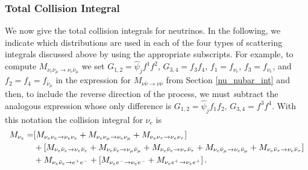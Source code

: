 \subsubsection{Total Collision Integral}
We now give the total collision integrals for neutrinos.    In the following, we indicate which distributions are used in each of the four types of scattering integrals discussed above by using the appropriate subscripts. For example, to compute $M_{\nu_e\bar\nu_\mu\rightarrow\nu_e\bar\nu_\mu}$  we set $G_{1,2}=\hat\psi_jf^1f^2$, $G_{3,4}=f_3f_4$, $f_1= f_{\nu_e}$, $f_3=f_{\nu_e}$, and $f_2=f_4=f_{\bar\nu_\mu}$ in the expression for $M_{\nu\bar\nu\rightarrow\nu\bar\nu}$ from Section \ref{nu_nubar_int} and then, to include the reverse direction of the process, we must {\emph subtract}  the analogous expression whose only difference is $G_{1,2}=\hat\psi_jf_1f_2$, $G_{3,4}=f^3f^4$.
With this notation the collision integral for $\nu_e$ is
\begin{align}\label{M_tot}
M_{\nu_e}=&[M_{\nu_e\nu_e\rightarrow\nu_e\nu_e}+M_{\nu_e\nu_\mu\rightarrow\nu_e\nu_\mu}+M_{\nu_e\nu_\tau\rightarrow\nu_e\nu_\tau}]\\
&+[M_{\nu_e\bar\nu_e\rightarrow\nu_e\bar\nu_e}+M_{\nu_e\bar\nu_e\rightarrow\nu_\mu\bar\nu_\mu}+M_{\nu_e\bar\nu_e\rightarrow\nu_\tau\bar\nu_\tau}+M_{\nu_e\bar\nu_\mu\rightarrow\nu_e\bar\nu_\mu}+M_{\nu_e\bar\nu_\tau\rightarrow\nu_e\bar\nu_\tau}]\notag\\
&+M_{\nu_e\bar\nu_e\rightarrow e^+e^-}+[M_{\nu_e e^-\rightarrow\nu_e e^-}+M_{\nu_e e^+\rightarrow\nu_e e^+}]\,.\notag
\end{align}


